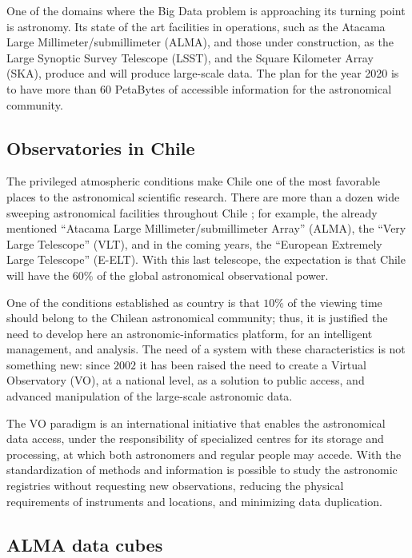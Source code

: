 \documentclass[]{spie}
\begin{document}
One of the domains where the Big Data problem is approaching its turning point
is astronomy.  Its state of the art facilities in operations, such as the
Atacama Large Millimeter/submillimeter (ALMA), and those under construction, as
the Large Synoptic Survey Telescope (LSST), and the Square Kilometer Array
(SKA), produce and will produce large-scale data.  The plan for the year 2020
is to have more than 60 PetaBytes of accessible information for the
astronomical community.

\subsection{Observatories in Chile}
\label{sec:obsinchile}
The privileged atmospheric conditions make Chile one of the most favorable
places to the astronomical scientific research.  There are more than a dozen
wide sweeping astronomical facilities throughout Chile \cite{roadmap}; for example, the
already mentioned ``Atacama Large Millimeter/submillimeter Array'' (ALMA), the
``Very Large Telescope'' (VLT), and in the coming years, the ``European Extremely
Large Telescope'' (E-ELT).  With this last telescope, the expectation is that
Chile will have the 60\% of the global astronomical observational power.

One of the conditions established as country is that $10\%$ of the viewing time
should belong to the Chilean astronomical community; thus, it is justified the
need to develop here an astronomic-informatics platform, for an intelligent
management, and analysis.  The need of a system with these characteristics is
not something new: since $2002$ it has been raised the need to create a Virtual
Observatory (VO), at a national level, as a solution to public access, and
advanced manipulation of the large-scale astronomic data.

The VO paradigm is an international initiative that enables the astronomical
data access, under the responsibility of specialized centres for its storage
and processing, at which both astronomers and regular people may accede.  With
the standardization of methods and information is possible to study the
astronomic registries without requesting new observations, reducing the physical
requirements of instruments and locations, and minimizing data duplication.

\subsection{ALMA data cubes}
\label{sec:almadatacubes}
\end{document}
